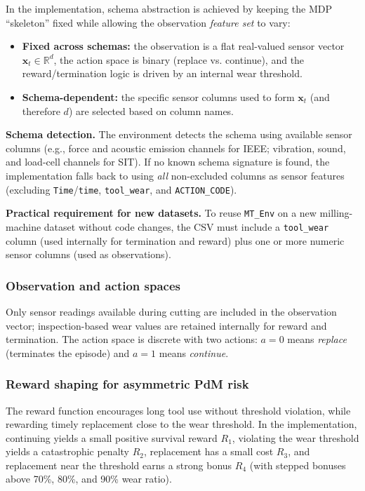 \documentclass[sn-basic]{sn-jnl} %
\begin{document}
In the implementation, schema abstraction is achieved by keeping the MDP ``skeleton'' fixed while allowing the observation \emph{feature set} to vary:
\begin{itemize}
        \item \textbf{Fixed across schemas:} the observation is a flat real-valued sensor vector $\mathbf{x}_t\in\mathbb{R}^d$, the action space is binary (replace vs. continue), and the reward/termination logic is driven by an internal wear threshold.
        \item \textbf{Schema-dependent:} the specific sensor columns used to form $\mathbf{x}_t$ (and therefore $d$) are selected based on column names.
\end{itemize}

\textbf{Schema detection.}
The environment detects the schema using available sensor columns (e.g., force and acoustic emission channels for IEEE; vibration, sound, and load-cell channels for SIT). If no known schema signature is found, the implementation falls back to using \emph{all} non-excluded columns as sensor features (excluding \texttt{Time}/\texttt{time}, \texttt{tool\_wear}, and \texttt{ACTION\_CODE}).

\textbf{Practical requirement for new datasets.}
To reuse \texttt{MT\_Env} on a new milling-machine dataset without code changes, the CSV must include a \texttt{tool\_wear} column (used internally for termination and reward) plus one or more numeric sensor columns (used as observations).

\subsubsection{Observation and action spaces}
Only sensor readings available during cutting are included in the observation vector; inspection-based wear values are retained internally for reward and termination. The action space is discrete with two actions: $a=0$ means \emph{replace} (terminates the episode) and $a=1$ means \emph{continue}.

\subsubsection{Reward shaping for asymmetric PdM risk}
\label{sec:reward}
The reward function encourages long tool use without threshold violation, while rewarding timely replacement close to the wear threshold. In the implementation, continuing yields a small positive survival reward $R_1$, violating the wear threshold yields a catastrophic penalty $R_2$, replacement has a small cost $R_3$, and replacement near the threshold earns a strong bonus $R_4$ (with stepped bonuses above 70\%, 80\%, and 90\% wear ratio).
\end{document}
